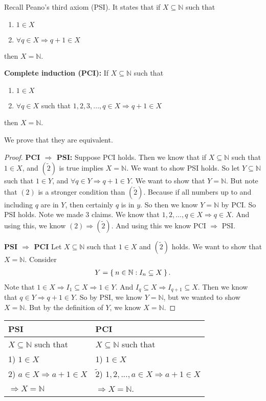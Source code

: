 \documentclass[12pt]{amsbook}
\theoremstyle{plain}
\numberwithin{section}{chapter}
\numberwithin{equation}{chapter}
\theoremstyle{definition}
\theoremstyle{remark}
\theoremstyle{plain}
\newcommand{\sub}{\subseteq}
\newcommand{\n}{\mathbb{N}}
\newcommand{\bee}{\begin{equation}\begin{aligned}}
\newcommand{\eee}{\end{aligned}\end{equation}}
\newcommand{\tilda}{\tilde}
\begin{document}
Recall Peano's third axiom (PSI). It states that if $X \sub \n$ such that
\begin{enumerate}
\item $1 \in X$
\item $\forall q \in X \Rightarrow q + 1 \in X$
\end{enumerate}
then $X = \n$. 

\textbf{Complete induction (PCI): }If $X \sub \n$ such that 
\begin{enumerate}[label=($\tilda{\arabic*})$]
\item $1 \in X$
\item $\forall q \in X$ such that $1,2,3,...,q \in X \Rightarrow q + 1 \in X$
\end{enumerate}
then $X = \n$. 

We prove that they are equivalent. 

\begin{proof}
\textbf{PCI $\Rightarrow$ PSI:} Suppose PCI holds. Then we know that if $X \sub \n$ such that $1 \in X$, and $(\tilda{2})$ is true implies $X = \n$. We want to show PSI holds. So let $Y \sub \n$ such that $1 \in Y$, and $\forall q \in Y \Rightarrow q + 1 \in Y$. We want to show that $Y = \n$. But note that $(2)$ is a stronger condition than $(\tilda{2})$. Because if all numbers up to and including $q$ are in $Y$, then certainly $q$ is in $y$. So then we know $Y = \n$ by PCI. So PSI holds. Note we made 3 claims. We know that $1,2,...,q \in X \Rightarrow q \in X$. And using this, we know $(2) \Rightarrow (\tilda{2})$. And using this we know PCI $\Rightarrow$ PSI. 

\textbf{PSI $\Rightarrow$ PCI} Let $X \sub \n$ such that $1 \in X$ and $(\tilda{2})$ holds. We want to show that $X = \n$. Consider 
\bee
Y = \Set{n \in \n:I_n \sub X}. 
\eee
Note that $1 \in X \Rightarrow I_1 \sub X \Rightarrow 1 \in Y$. And $I_q \sub X \Rightarrow I_{q + 1} \sub X$. Then we know that $q \in Y \Rightarrow q + 1 \in Y$. So by PSI, we know $Y = \n$, but we wanted to show $X = \n$. But by the definition of $Y$, we know $X = \n$. 
\end{proof}
\begin{center}
\begin{tabular}{l|l}
PSI & PCI\\
\hline
$X \sub \n$ such that & $X \sub \n$ such that\\
1) $1 \in X$ & 1) $1 \in X$\\
2) $a \in X \Rightarrow a + 1 \in X$ & $\tilda{2}$) $1,2,...,a \in X \Rightarrow a + 1 \in X$\\
$\Rightarrow X = \n$ & $\Rightarrow X = \n$. 
\end{tabular}
\end{center}
\end{document}
